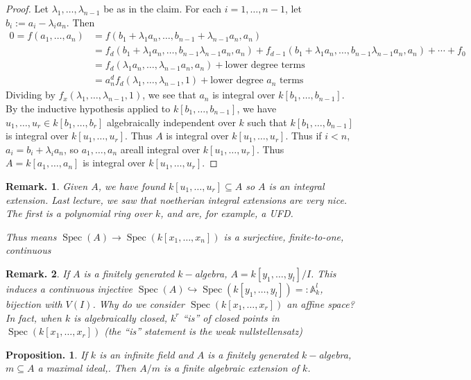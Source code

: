 \documentclass[11pt, a4paper]{memoir}
\newcommand{\hto}[0]{\ensuremath{\hookrightarrow}}
\theoremstyle{change}
\newtheorem{proposition}[theorem]{Proposition.}
\theoremstyle{plain}
\theoremstyle{nonumberplain}
\newtheorem{remark}{Remark.}
\newtheorem{proof}{Proof}
\DeclareMathOperator{\Spec}{Spec}
\numberwithin{equation}{section}
\begin{document}
\begin{proof}
    Let $\lambda_1,\ldots,\lambda_{n-1}$ be as in the claim.
    For each $i=1,\ldots,n-1$, let $b_i:=a_i-\lambda_ia_n$.
    Then
    \begin{align*}
        0=f(a_1,\ldots,a_n) &= f(b_1+\lambda_1a_n,\ldots,b_{n-1}+\lambda_{n-1}a_n,a_n)\\
                            &= f_d(b_1+\lambda_1 a_n,\ldots,b_{n-1}\lambda_{n-1}a_n,a_n)+f_{d-1}(b_1+\lambda_1 a_n,\ldots,b_{n-1}\lambda_{n-1}a_n,a_n)+\cdots+f_0\\
                            &= f_d(\lambda_1a_n,\ldots,\lambda_{n-1}a_n,a_n)+\text{lower degree terms}\\
                            &= a_n^df_d(\lambda_1,\ldots,\lambda_{n-1},1)+\text{lower degree $a_n$ terms}
    \end{align*}
    Dividing by $f_x(\lambda_1,\ldots,\lambda_{n-1},1)$, we see that $a_n$ is integral over $k[b_1,\ldots,b_{n-1}]$.
    By the inductive hypothesis applied to $k[b_1,\ldots,b_{n-1}]$, we have $u_1,\ldots,u_r\in k[b_1,\ldots,b_r]$ algebraically independent over $k$ such that $k[b_1,\ldots,b_{n-1}]$ is integral over $k[u_1,\ldots,u_r]$.
    Thus $A$ is integral over $k[u_1,\ldots,u_r]$.
    Thus if $i<n$, $a_i=b_i+\lambda_ia_n$, so $a_1,\ldots,a_n$ areall integral over $k[u_1,\ldots,u_r]$.
    Thus $A=k[a_1,\ldots,a_n]$ is integral over $k[u_1,\ldots,u_r]$.
\end{proof}
\begin{remark}
    Given $A$, we have found $k[u_1,\ldots,u_r]\subseteq A$ so $A$ is an integral extension.
    Last lecture, we saw that noetherian integral extensions are very nice.
    The first is a polynomial ring over $k$, and are, for example, a UFD.

    Thus means $\Spec(A)\to\Spec(k[x_1,\ldots,x_n])$ is a surjective, finite-to-one, continuous
\end{remark}
\begin{remark}
    If $A$ is a finitely generated $k-$algebra, $A=k[y_1,\ldots,y_l]/I$.
    This induces a continuous injective $\Spec(A)\hto\Spec(k[y_1,\ldots,y_l])=:\mathbb{A}_k^l$, bijection with $V(I)$.
    Why do we consider $\Spec(k[x_1,\ldots,x_r])$ an affine space?
    In fact, when $k$ is algebraically closed, $k^r$ ``is'' of closed points in $\Spec(k[x_1,\ldots,x_r])$ (the ``is'' statement is the weak nullstellensatz)
\end{remark}
\begin{proposition}
    If $k$ is an infinite field and $A$ is a finitely generated $k-$algebra, $m\subseteq A$ a maximal ideal,.
    Then $A/m$ is a finite algebraic extension of $k$.
\end{proposition}
\end{document}

